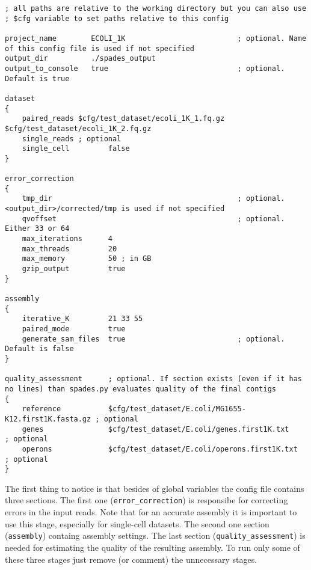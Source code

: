 \documentclass{article}
\def\spades{SPAdes}
\begin{document}
\begin{lstlisting}													
; all paths are relative to the working directory but you can also use 
; $cfg variable to set paths relative to this config

project_name        ECOLI_1K                          ; optional. Name of this config file is used if not specified
output_dir          ./spades_output
output_to_console   true                              ; optional. Default is true

dataset
{
    paired_reads $cfg/test_dataset/ecoli_1K_1.fq.gz $cfg/test_dataset/ecoli_1K_2.fq.gz
    single_reads ; optional
    single_cell         false
}

error_correction
{
    tmp_dir                                           ; optional. <output_dir>/corrected/tmp is used if not specified
    qvoffset                                          ; optional. Either 33 or 64
    max_iterations      4
    max_threads         20
    max_memory          50 ; in GB
    gzip_output         true
}

assembly
{
    iterative_K         21 33 55
    paired_mode         true
    generate_sam_files  true                          ; optional. Default is false
}

quality_assessment      ; optional. If section exists (even if it has no lines) than spades.py evaluates quality of the final contigs
{
    reference           $cfg/test_dataset/E.coli/MG1655-K12.first1K.fasta.gz ; optional
    genes               $cfg/test_dataset/E.coli/genes.first1K.txt           ; optional
    operons             $cfg/test_dataset/E.coli/operons.first1K.txt         ; optional
}
\end{lstlisting}

The first thing to notice is that besides of global variables the config file contains three sections. The first one ({\tt error\_correction}) is responsibe for correcting errors in the input reads.
Note that for an accurate assembly it is important to use this stage, especially
for single-cell datasets.
The second one section ({\tt assembly}) 
containg assembly settings.
The last section ({\tt quality\_assessment})
is needed for estimating the quality of the resulting assembly.
To run only some of these three stages just remove (or comment) the unnecessary stages.

\end{document}
